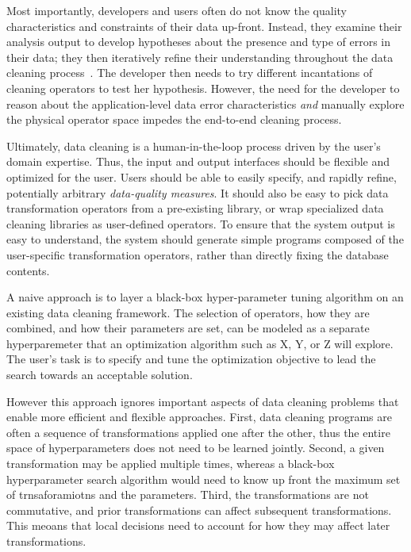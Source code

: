 Most importantly, developers and users often do not know the quality characteristics and constraints of their data up-front.  Instead, they examine their analysis output to develop hypotheses about the presence and type of errors in their data; they then iteratively refine their understanding throughout the data cleaning process~\cite{krishnan2016hilda}.  The developer then needs to try different incantations of cleaning operators to test her hypothesis.   However, the need for the developer to reason about the application-level data error characteristics {\it and} manually explore the physical operator space impedes the end-to-end cleaning process.   

Ultimately, data cleaning is a human-in-the-loop process driven by the user's domain expertise.  Thus, the input and output interfaces should be flexible and optimized for the user.   Users should be able to easily specify, and rapidly refine, potentially arbitrary {\it data-quality measures}.  It should also be easy to pick data transformation operators from a pre-existing library, or wrap specialized data cleaning libraries as user-defined operators.  To ensure that the system output is easy to understand, the system should generate simple programs composed of the user-specific transformation operators, rather than directly fixing the database contents.

A naive approach is to layer a black-box hyper-parameter tuning algorithm on an existing data cleaning framework.  The selection of operators, how they are combined, and how their parameters are set, can be modeled as a separate hyperparemeter that an optimization algorithm such as X, Y, or Z will explore.  The user's task is to specify and tune the optimization objective to lead the search towards an acceptable solution.   

However this approach ignores important aspects of data cleaning problems that enable more efficient and flexible approaches.  First, data cleaning programs are often a sequence of transformations applied one after the other, thus the entire space of hyperparameters does not need to be learned jointly.  Second, a given transformation may be applied multiple times, whereas a black-box hyperparameter search algorithm would need to know up front the maximum set of trnsaforamiotns and the parameters. Third, the transformations are not commutative, and prior transformations can affect subsequent transformations.  This meoans that local decisions need to account for how they may affect later transformations.  


